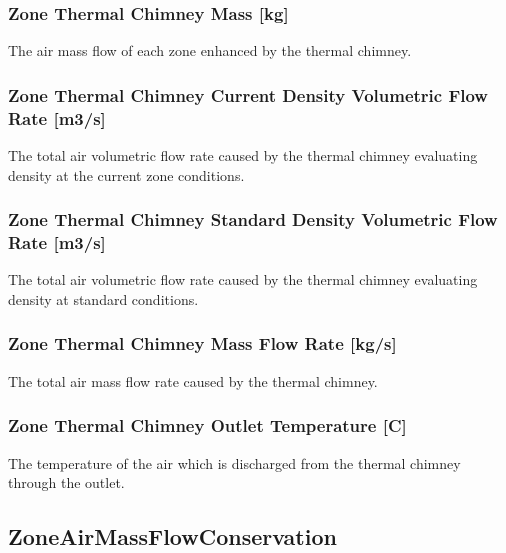 \subsubsection{Zone Thermal Chimney Mass {[}kg{]}}\label{zone-thermal-chimney-mass-kg}

The air mass flow of each zone enhanced by the thermal chimney.

\subsubsection{Zone Thermal Chimney Current Density Volumetric Flow Rate {[}m3/s{]}}\label{zone-thermal-chimney-current-density-volumetric-flow-rate-m3s}

The total air volumetric flow rate caused by the thermal chimney evaluating density at the current zone conditions.

\subsubsection{Zone Thermal Chimney Standard Density Volumetric Flow Rate {[}m3/s{]}}\label{zone-thermal-chimney-standard-density-volumetric-flow-rate-m3s}

The total air volumetric flow rate caused by the thermal chimney evaluating density at standard conditions.

\subsubsection{Zone Thermal Chimney Mass Flow Rate {[}kg/s{]}}\label{zone-thermal-chimney-mass-flow-rate-kgs}

The total air mass flow rate caused by the thermal chimney.

\subsubsection{Zone Thermal Chimney Outlet Temperature {[}C{]}}\label{zone-thermal-chimney-outlet-temperature-c}

The temperature of the air which is discharged from the thermal chimney through the outlet.

\subsection{ZoneAirMassFlowConservation}\label{zoneairmassflowconservation}

